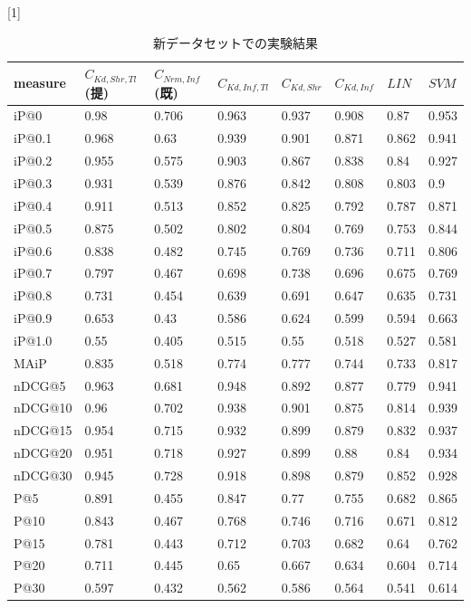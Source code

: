 \begin{table}[h]
 \caption{新データセットでの実験結果} 
\label{tbl:resultNew}
  \begin{center} {
\scalebox{0.9}[1]{
    \begin{tabular}{|l|l|l|lllll|}\hline
measure&$C_{Kd,Shr,Tl}$(提)&$C_{Nrm,Inf}$(既)&$C_{Kd,Inf,Tl}$&$C_{Kd,Shr}$&$C_{Kd,Inf}$&$LIN$&$SVM$\\ \hline
iP@0&0.98&0.706&0.963&0.937&0.908&0.87&0.953\\
iP@0.1&0.968&0.63&0.939&0.901&0.871&0.862&0.941\\
iP@0.2&0.955&0.575&0.903&0.867&0.838&0.84&0.927\\
iP@0.3&0.931&0.539&0.876&0.842&0.808&0.803&0.9\\
iP@0.4&0.911&0.513&0.852&0.825&0.792&0.787&0.871\\
iP@0.5&0.875&0.502&0.802&0.804&0.769&0.753&0.844\\
iP@0.6&0.838&0.482&0.745&0.769&0.736&0.711&0.806\\
iP@0.7&0.797&0.467&0.698&0.738&0.696&0.675&0.769\\
iP@0.8&0.731&0.454&0.639&0.691&0.647&0.635&0.731\\
iP@0.9&0.653&0.43&0.586&0.624&0.599&0.594&0.663\\
iP@1.0&0.55&0.405&0.515&0.55&0.518&0.527&0.581\\ \hline
MAiP&0.835&0.518&0.774&0.777&0.744&0.733&0.817\\ \hline
nDCG@5&0.963&0.681&0.948&0.892&0.877&0.779&0.941\\
nDCG@10&0.96&0.702&0.938&0.901&0.875&0.814&0.939\\
nDCG@15&0.954&0.715&0.932&0.899&0.879&0.832&0.937\\
nDCG@20&0.951&0.718&0.927&0.899&0.88&0.84&0.934\\
nDCG@30&0.945&0.728&0.918&0.898&0.879&0.852&0.928\\ \hline
P@5&0.891&0.455&0.847&0.77&0.755&0.682&0.865\\
P@10&0.843&0.467&0.768&0.746&0.716&0.671&0.812\\
P@15&0.781&0.443&0.712&0.703&0.682&0.64&0.762\\
P@20&0.711&0.445&0.65&0.667&0.634&0.604&0.714\\
P@30&0.597&0.432&0.562&0.586&0.564&0.541&0.614\\ \hline
    \end{tabular}
  }
    }
  \end{center}
\end{table}

